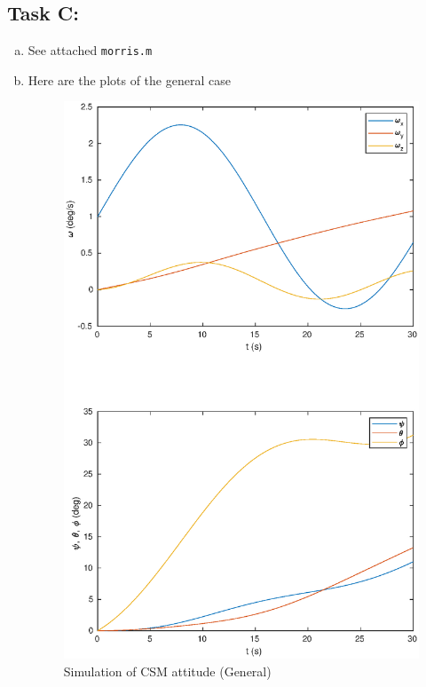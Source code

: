 \documentclass[a4paper]{article}
\begin{document}
\subsection*{Task C:}%
\begin{enumerate}[a.]
  \item  See attached \texttt{morris.m}
  \item  Here are the plots of the general case
    \begin{figure}[H]
    \begin{center}
      \includegraphics[scale=0.7]{task_c.eps}
    \end{center}
    \caption{Simulation of CSM attitude (General)}
    \label{fig:task_c}
    \end{figure}


\end{enumerate}
\end{document}
